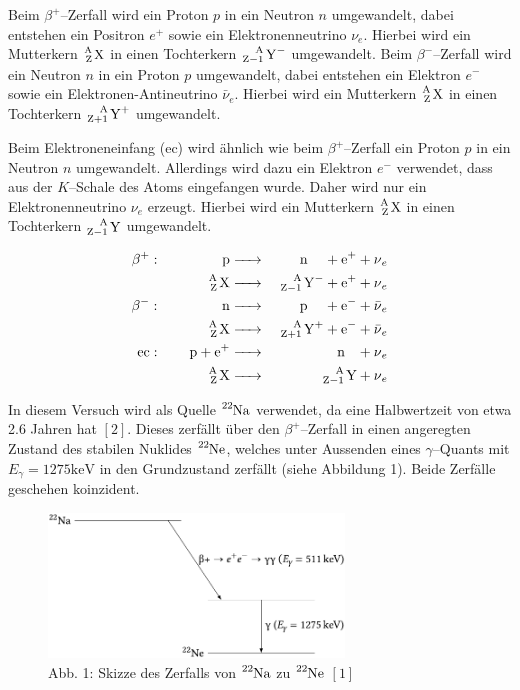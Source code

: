 \documentclass[12pt,a4paper]{scrartcl}
\numberwithin{equation}{section} %
\newcommand{\pu}[1]{\ensuremath{\mathrm{#1}}}
\renewcommand{\[}{} %
\renewcommand{\]}{\noindent} %
\begin{document}
Beim \(\beta^+\)--Zerfall wird ein Proton \(p\) in ein Neutron \(n\)
umgewandelt, dabei entstehen ein Positron \(e^+\) sowie ein
Elektronenneutrino \(\nu_e\). Hierbei wird ein Mutterkern
\(\ce{^A_Z X}\) in einen Tochterkern \(\ce{^A_{Z-1} Y^-}\) umgewandelt.
Beim \(\beta^-\)--Zerfall wird ein Neutron \(n\) in ein Proton \(p\)
umgewandelt, dabei entstehen ein Elektron \(e^-\) sowie ein
Elektronen-Antineutrino \(\bar{\nu}_e\). Hierbei wird ein Mutterkern
\(\ce{^A_Z X}\) in einen Tochterkern \(\ce{^A_{Z+1} Y^+}\) umgewandelt.

Beim Elektroneneinfang (ec) wird ähnlich wie beim \(\beta^+\)--Zerfall
ein Proton \(p\) in ein Neutron \(n\) umgewandelt. Allerdings wird dazu
ein Elektron \(e^-\) verwendet, dass aus der \(K\)--Schale des Atoms
eingefangen wurde. Daher wird nur ein Elektronenneutrino \(\nu_e\)
erzeugt. Hierbei wird ein Mutterkern \(\ce{^A_Z X}\) in einen
Tochterkern \(\ce{^A_{Z-1} Y}\) umgewandelt.

\[
\begin{eqnarray}
    \beta^+:\qquad\,\,\qquad
        \ce{p} &\ce{->}& \quad \ce{n} \quad\, + \ce{e^+} + \ce{\nu_e} \\
        \ce{^A_Z X} &\ce{->}& \ce{^A_{Z-1} Y^-} + \ce{e^+} + \ce{\nu_e} \\
    \beta^-:\qquad\,\,\qquad
        \ce{n} &\ce{->}& \quad \ce{p} \quad\, + \ce{e^-} + \ce{\bar{\nu}_e} \\
        \ce{^A_Z X} &\ce{->}& \ce{^A_{Z+1} Y^+} + \ce{e^-} + \ce{\bar{\nu}_e} \\
    \text{ec}:\qquad
        \ce{p + e^+} &\ce{->}& \quad \ce{n} \ \ \, + \ce{\nu_e} \\
        \ce{^A_Z X} &\ce{->}& \ce{^A_{Z-1} Y} + \ce{\nu_e}
\end{eqnarray}
\]

In diesem Versuch wird als Quelle \(\ce{^{22}Na}\) verwendet, da eine
Halbwertzeit von etwa 2.6 Jahren hat \([2]\). Dieses zerfällt über den
\(\beta^+\)--Zerfall in einen angeregten Zustand des stabilen Nuklides
\(\ce{^{22}Ne}\), welches unter Aussenden eines \(\gamma\)--Quants mit
\(E_\gamma = \pu{1275 keV}\) in den Grundzustand zerfällt (siehe
Abbildung 1). Beide Zerfälle geschehen koinzident.

\begin{figure}
	\centering
	\includegraphics[width=0.7\textwidth]{../media/B3.4/Zerfall_22_Na.pdf}
	\caption{Abb. 1: Skizze des Zerfalls von \(\ce{^{22}Na}\) zu \(\ce{^{22}Ne}\) \([1]\)}
	\label{abb:Skizze 22Na}
\end{figure}
\end{document}
